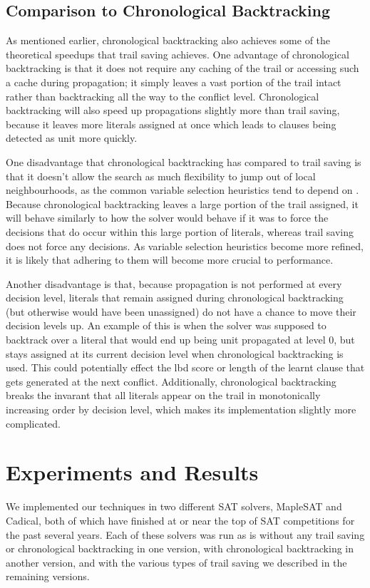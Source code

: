 \documentclass{article}
\begin{document}
\subsection{Comparison to Chronological Backtracking}
As mentioned earlier, chronological backtracking also achieves some of the theoretical speedups that trail saving achieves. One advantage of chronological backtracking is that it does not require any caching of the trail or accessing such a cache during propagation; it simply leaves a vast portion of the trail intact rather than backtracking all the way to the conflict level. Chronological backtracking will also speed up propagations slightly more than trail saving, because it leaves more literals assigned at once which leads to clauses being detected as unit more quickly.

One disadvantage that chronological backtracking has compared to trail saving is that it doesn't allow the search as much flexibility to jump out of local neighbourhoods, as the common variable selection heuristics tend to depend on \cite{DBLP:conf/dac/MoskewiczMZZM01, DBLP:conf/sat/2015, DBLP:conf/sat/LiangGPC16}. Because chronological backtracking leaves a large portion of the trail assigned, it will behave similarly to how the solver would behave if it was to force the decisions that do occur within this large portion of literals, whereas trail saving does not force any decisions. As variable selection heuristics become more refined, it is likely that adhering to them will become more crucial to performance.

Another disadvantage is that, because propagation is not performed at every decision level, literals that remain assigned during chronological backtracking (but otherwise would have been unassigned) do not have a chance to move their decision levels up. An example of this is when the solver was supposed to backtrack over a literal that would end up being unit propagated at level 0, but stays assigned at its current decision level when chronological backtracking is used. This could potentially effect the lbd score or length of the learnt clause that gets generated at the next conflict. Additionally, chronological backtracking breaks the invarant that all literals appear on the trail in monotonically increasing order by decision level, which makes its implementation slightly more complicated.

\section{Experiments and Results}
We implemented our techniques in two different SAT solvers, MapleSAT and Cadical, both of which have finished at or near the top of SAT competitions for the past several years. Each of these solvers was run as is without any trail saving or chronological backtracking in one version, with chronological backtracking in another version, and with the various types of trail saving we described in the remaining versions.
\end{document}
